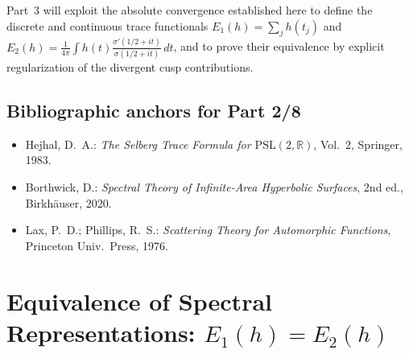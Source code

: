 \begin{remark}
\label{rem:forward-part3}
Part~3 will exploit the absolute convergence established here to define the discrete and continuous trace functionals
$E_1(h)=\sum_j h(t_j)$ and $E_2(h)=\frac{1}{4\pi}\int h(t)\frac{\sigma'(1/2+it)}{\sigma(1/2+it)}\,dt$,
and to prove their equivalence by explicit regularization of the divergent cusp contributions. \relax
\end{remark}

\subsection{Bibliographic anchors for Part 2/8}
\label{subsec:ch4-part2-bib-anchors} \relax

\begin{itemize}
  \item Hejhal, D.~A.: \emph{The Selberg Trace Formula for $\mathrm{PSL}(2,\mathbb{R})$}, Vol.~2, Springer, 1983. %
  \item Borthwick, D.: \emph{Spectral Theory of Infinite-Area Hyperbolic Surfaces}, 2nd ed., Birkhäuser, 2020. %
  \item Lax, P.~D.; Phillips, R.~S.: \emph{Scattering Theory for Automorphic Functions}, Princeton Univ.\ Press, 1976. %
\end{itemize}


\section{Equivalence of Spectral Representations: $E_1(h)=E_2(h)$}
\label{sec:ch4-part3-equivalence} \relax \hspace{0pt}

